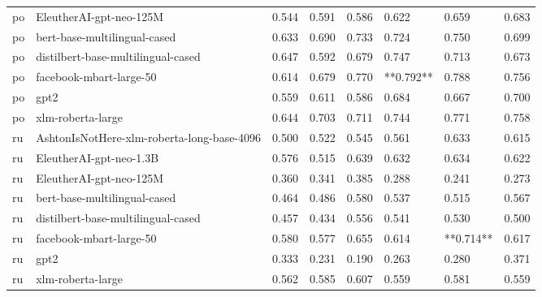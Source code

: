\begin{tabular}{llllllll}
      po &                    EleutherAI-gpt-neo-125M & 0.544 &                     0.591 &                 0.586 &                  0.622 &                                   0.659 &     0.683 \\
      po &               bert-base-multilingual-cased & 0.633 &                     0.690 &                 0.733 &                  0.724 &                                   0.750 &     0.699 \\
      po &         distilbert-base-multilingual-cased & 0.647 &                     0.592 &                 0.679 &                  0.747 &                                   0.713 &     0.673 \\
      po &                    facebook-mbart-large-50 & 0.614 &                     0.679 &                 0.770 &              **0.792** &                                   0.788 &     0.756 \\
      po &                                       gpt2 & 0.559 &                     0.611 &                 0.586 &                  0.684 &                                   0.667 &     0.700 \\
      po &                          xlm-roberta-large & 0.644 &                     0.703 &                 0.711 &                  0.744 &                                   0.771 &     0.758 \\
      ru & AshtonIsNotHere-xlm-roberta-long-base-4096 & 0.500 &                     0.522 &                 0.545 &                  0.561 &                                   0.633 &     0.615 \\
      ru &                    EleutherAI-gpt-neo-1.3B & 0.576 &                     0.515 &                 0.639 &                  0.632 &                                   0.634 &     0.622 \\
      ru &                    EleutherAI-gpt-neo-125M & 0.360 &                     0.341 &                 0.385 &                  0.288 &                                   0.241 &     0.273 \\
      ru &               bert-base-multilingual-cased & 0.464 &                     0.486 &                 0.580 &                  0.537 &                                   0.515 &     0.567 \\
      ru &         distilbert-base-multilingual-cased & 0.457 &                     0.434 &                 0.556 &                  0.541 &                                   0.530 &     0.500 \\
      ru &                    facebook-mbart-large-50 & 0.580 &                     0.577 &                 0.655 &                  0.614 &                               **0.714** &     0.617 \\
      ru &                                       gpt2 & 0.333 &                     0.231 &                 0.190 &                  0.263 &                                   0.280 &     0.371 \\
      ru &                          xlm-roberta-large & 0.562 &                     0.585 &                 0.607 &                  0.559 &                                   0.581 &     0.559 \\
\bottomrule
\end{tabular}
